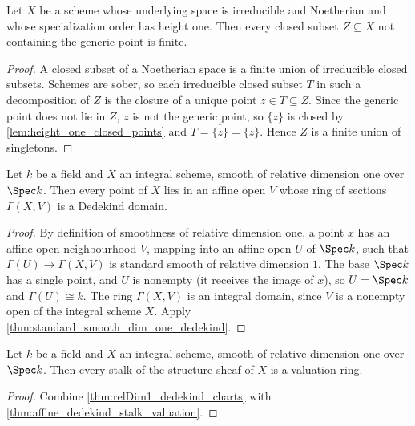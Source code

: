 \begin{theorem}
  \label{thm:height_one_finite_closed}
  \leanok
  Let \(X\) be a scheme whose underlying space is irreducible and Noetherian and whose
  specialization order has height one. Then every closed subset \(Z \subseteq X\) not
  containing the generic point is finite.
\end{theorem}
\begin{proof}
  \leanok
  A closed subset of a Noetherian space is a finite union of irreducible closed subsets.
  Schemes are sober, so each irreducible closed subset \(T\) in such a decomposition of
  \(Z\) is the closure of a unique point \(z \in T \subseteq Z\). Since the generic point
  does not lie in \(Z\), \(z\) is not the generic point, so \(\{z\}\) is closed by
  \ref{lem:height_one_closed_points} and \(T = \overline{\{z\}} = \{z\}\). Hence \(Z\) is a
  finite union of singletons.
\end{proof}

\begin{theorem}
  \label{thm:relDim1_dedekind_charts}
  \leanok
  Let \(k\) be a field and \(X\) an integral scheme, smooth of relative dimension one over
  \(\Spec k\). Then every point of \(X\) lies in an affine open \(V\) whose ring of
  sections \(\Gamma(X, V)\) is a Dedekind domain.
\end{theorem}
\begin{proof}
  \leanok
  By definition of smoothness of relative dimension one, a point \(x\) has an affine open
  neighbourhood \(V\), mapping into an affine open \(U\) of \(\Spec k\), such that
  \(\Gamma(U) \to \Gamma(X, V)\) is standard smooth of relative dimension \(1\). The base
  \(\Spec k\) has a single point, and \(U\) is nonempty (it receives the image of \(x\)),
  so \(U = \Spec k\) and \(\Gamma(U) \cong k\). The ring \(\Gamma(X, V)\) is an integral
  domain, since \(V\) is a nonempty open of the integral scheme \(X\). Apply
  \ref{thm:standard_smooth_dim_one_dedekind}.
\end{proof}

\begin{theorem}
  \label{thm:relDim1_stalks_valuation}
  \leanok
  Let \(k\) be a field and \(X\) an integral scheme, smooth of relative dimension one over
  \(\Spec k\). Then every stalk of the structure sheaf of \(X\) is a valuation ring.
\end{theorem}
\begin{proof}
  \leanok
  Combine \ref{thm:relDim1_dedekind_charts} with
  \ref{thm:affine_dedekind_stalk_valuation}.
\end{proof}

